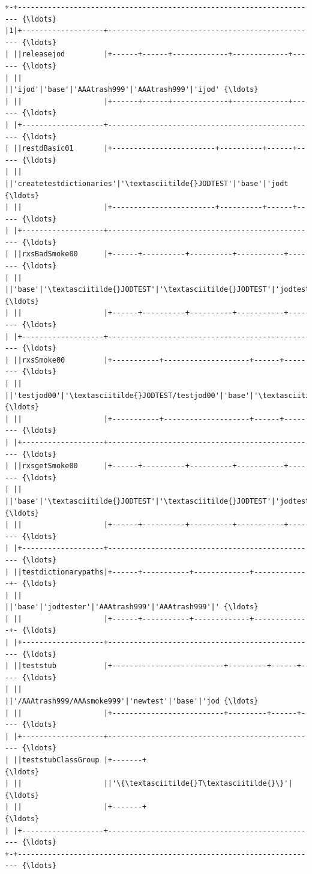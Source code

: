 \documentclass[11pt,letter,landscape]{article}
\begin{document}
    \begin{Verbatim}[commandchars=\\\{\}]
+-+---------------------------------------------------------------------- {\ldots}
|1|+-------------------+------------------------------------------------- {\ldots}
| ||releasejod         |+------+------+-------------+-------------+------ {\ldots}
| ||                   ||'ijod'|'base'|'AAAtrash999'|'AAAtrash999'|'ijod' {\ldots}
| ||                   |+------+------+-------------+-------------+------ {\ldots}
| |+-------------------+------------------------------------------------- {\ldots}
| ||restdBasic01       |+------------------------+----------+------+----- {\ldots}
| ||                   ||'createtestdictionaries'|'\textasciitilde{}JODTEST'|'base'|'jodt {\ldots}
| ||                   |+------------------------+----------+------+----- {\ldots}
| |+-------------------+------------------------------------------------- {\ldots}
| ||rxsBadSmoke00      |+------+----------+----------+-----------+------- {\ldots}
| ||                   ||'base'|'\textasciitilde{}JODTEST'|'\textasciitilde{}JODTEST'|'jodtester'|'AAAsmo {\ldots}
| ||                   |+------+----------+----------+-----------+------- {\ldots}
| |+-------------------+------------------------------------------------- {\ldots}
| ||rxsSmoke00         |+-----------+--------------------+------+-------- {\ldots}
| ||                   ||'testjod00'|'\textasciitilde{}JODTEST/testjod00'|'base'|'\textasciitilde{}JODTES {\ldots}
| ||                   |+-----------+--------------------+------+-------- {\ldots}
| |+-------------------+------------------------------------------------- {\ldots}
| ||rxsgetSmoke00      |+------+----------+----------+-----------+------- {\ldots}
| ||                   ||'base'|'\textasciitilde{}JODTEST'|'\textasciitilde{}JODTEST'|'jodtester'|'AAAtra {\ldots}
| ||                   |+------+----------+----------+-----------+------- {\ldots}
| |+-------------------+------------------------------------------------- {\ldots}
| ||testdictionarypaths|+------+-----------+-------------+-------------+- {\ldots}
| ||                   ||'base'|'jodtester'|'AAAtrash999'|'AAAtrash999'|' {\ldots}
| ||                   |+------+-----------+-------------+-------------+- {\ldots}
| |+-------------------+------------------------------------------------- {\ldots}
| ||teststub           |+--------------------------+---------+------+---- {\ldots}
| ||                   ||'/AAAtrash999/AAAsmoke999'|'newtest'|'base'|'jod {\ldots}
| ||                   |+--------------------------+---------+------+---- {\ldots}
| |+-------------------+------------------------------------------------- {\ldots}
| ||teststubClassGroup |+-------+                                         {\ldots}
| ||                   ||'\{\textasciitilde{}T\textasciitilde{}\}'|                                         {\ldots}
| ||                   |+-------+                                         {\ldots}
| |+-------------------+------------------------------------------------- {\ldots}
+-+---------------------------------------------------------------------- {\ldots}
    \end{Verbatim}
\end{document}
